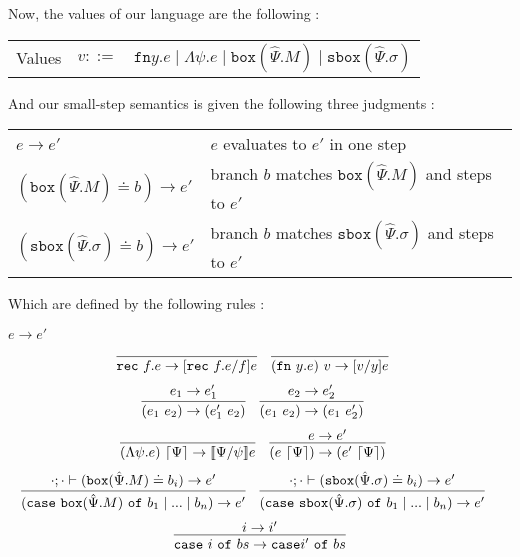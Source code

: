 \documentclass[letterpaper, 11pt]{article}
\newcommand{\rar}{\rightarrow}
\newcommand{\rec}{\texttt{rec}}
\newcommand{\fn}{\texttt{fn}}
\newcommand{\case}{\texttt{case}}
\newcommand{\of}{\texttt{of}}
\newcommand{\bbox}{\texttt{box}}
\newcommand{\sbbox}{\texttt{sbox}}
\begin{document}
    Now, the values of our language are the following :
    
    \begin{center}
      \begin{tabular}{rrl}
        Values & $v ::=$ & $\fn y.e \mid \Lambda \psi.e \mid \bbox(\hat{\Psi}. M) \mid \sbbox(\hat{\Psi}. \sigma)$
      \end{tabular}
    \end{center}

    And our small-step semantics is given the following three judgments : 

    \begin{center}
      \begin{tabular}{ll}
        $e \rar e'$                                    & $e$ evaluates to $e'$ in one step \\
        $(\bbox(\hat{\Psi}.M) \doteq b) \rar e'$       & branch $b$ matches $\bbox(\hat{\Psi}.M)$ and steps to $e'$ \\
        $(\sbbox(\hat{\Psi}.\sigma) \doteq b) \rar e'$ & branch $b$ matches $\sbbox(\hat{\Psi}.\sigma)$ and steps to $e'$
      \end{tabular}
    \end{center}

    Which are defined by the following rules :

    $\boxed{e \rar e'}$

    \begin{align*}
      & \infer{\rec \ f.e \rar [\rec \ f.e / f] e}{} &
      & \infer{(\fn \ y. e) \ v \rar [v/y] e}{}
    \end{align*}
    \begin{align*}
      & \infer{(e_1 \ e_2) \rar (e_1' \ e_2)}{e_1 \rar e_1'} &
      & \infer{(e_1 \ e_2) \rar (e_1 \ e_2')}{e_2 \rar e_2'}
    \end{align*}
    \begin{align*}
      & \infer{(\Lambda \psi. e) \ \lceil \Psi \rceil \rar \llbracket \Psi / \psi \rrbracket e}{} &
      & \infer{(e \ \lceil \Psi \rceil) \rar (e' \ \lceil \Psi \rceil)}{e \rar e'}
    \end{align*}
    \begin{align*}
      & \infer{(\case \ \bbox(\hat{\Psi}. M) \ \of \ b_1 \mid ... \mid b_n) \rar e'}
              {\cdot ; \cdot \vdash ( \bbox(\hat{\Psi}.M) \doteq b_i) \rar e'} &
      & \infer{(\case \ \sbbox(\hat{\Psi}. \sigma) \ \of \ b_1 \mid ... \mid b_n) \rar e'}
              {\cdot ; \cdot \vdash ( \sbbox(\hat{\Psi}.\sigma) \doteq b_i) \rar e'}
    \end{align*}
    \begin{align*}
      \infer{\case \ i \ \of \ bs \rar \case i' \ \of \ bs}{i \rar i'}
    \end{align*}
\end{document}
